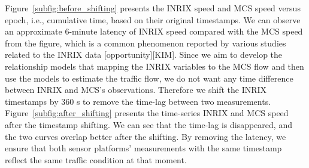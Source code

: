 \documentclass[english]{kththesis}
\begin{document}
Figure~\ref{subfig:before_shifting} presents the INRIX speed and MCS speed versus epoch, i.e., cumulative time, based on their original timestamps. We can observe an approximate 6-minute latency of INRIX speed compared with the MCS speed from the figure, which is a common phenomenon reported by various studies related to the INRIX data [opportunity][KIM]. Since we aim to develop the relationship models that mapping the INRIX variables to the MCS flow and then use the models to estimate the traffic flow, we do not want any time difference between INRIX and MCS's observations. Therefore we shift the INRIX timestamps by 360 s to remove the time-lag between two measurements. Figure~\ref{subfig:after_shifting} presents the time-series INRIX and MCS speed after the timestamp shifting. We can see that the time-lag is disappeared, and the two curves overlap better after the shifting. By removing the latency, we ensure that both sensor platforms' measurements with the same timestamp reflect the same traffic condition at that moment.
\end{document}
